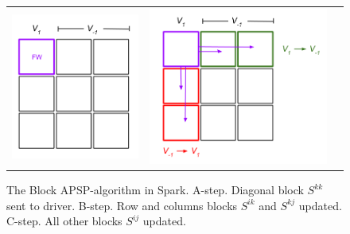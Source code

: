 \documentclass{article} %
\begin{document}
\begin{figure}[h]
\caption{The Block APSP-algorithm in Spark.
A-step. Diagonal block $S^{kk}$ sent to driver.
B-step. Row and columns blocks $S^{ik}$ and $S^{kj}$ updated.
C-step. All other blocks $S^{ij}$ updated.}
\begin{tabular}{ccc}
\includegraphics[scale = 0.3, trim = 0in -0.55in 0in 0in, clip]{blockApsp-2.png} &
\includegraphics[scale = 0.3]{blockApsp-3.png} &

\end{tabular}
\end{figure}
\end{document}
